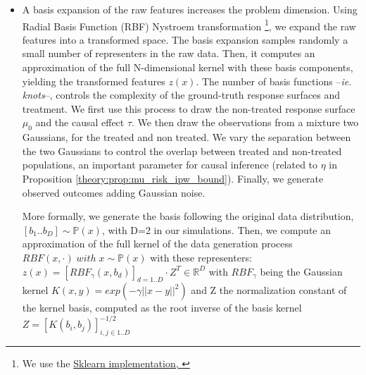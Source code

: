 \documentclass[unnumsec,webpdf,contemporary,large]{oup-authoring-template}%
\theoremstyle{thmstyleone}%
\theoremstyle{thmstyletwo}%
\theoremstyle{thmstylethree}%
\begin{document}
\begin{appendices}
\begin{itemize}
        \item A basis expansion of the raw features increases the problem dimension.
              Using Radial Basis Function (RBF) Nystroem transformation \footnote{We
                  use the
                  \href{https://scikit-learn.org/stable/modules/generated/sklearn.kernel_approximation.Nystroem.html}{Sklearn
                      implementation, \cite{pedregosa_scikitlearn_2011}}}, we expand the raw
              features into a transformed space. The basis expansion samples
              randomly a small number of representers in the raw data. Then,  it
              computes an approximation of the full N-dimensional kernel with these
              basis components, yielding the transformed features $z(x)$. The number
              of basis functions --\emph{ie. knots}--, controls the complexity of
              the ground-truth response surfaces and treatment. We first use this
              process to draw the non-treated response surface $\mu_0$ and the
              causal effect $\tau$. We then draw the observations from a mixture two
              Gaussians, for the treated and non treated. We vary the separation
              between the two Gaussians to control the overlap between treated and
              non-treated populations, an important parameter for causal inference
              (related to $\eta$ in Proposition
              \ref{theory:prop:mu_risk_ipw_bound}). Finally, we generate observed
              outcomes adding Gaussian noise.

              More formally, we generate the basis following the original data
              distribution, $\left [ b_1 .. b_D \right ] \sim \mathbb P(x)$,
              with D=2 in our simulations. Then, we compute an approximation
              of the full kernel of the data generation process $RBF(x,
                  \cdot) \;  with \; x \sim \mathbb P(x)$ with these
              representers: $z(x) = [RBF_{\gamma}(x, b_d)]_{d=1..D} \cdot
                  Z^T \in \mathbb{R}^D$ with $RBF_{\gamma}$ being the Gaussian
              kernel $K(x, y) = exp(-\gamma ||x-y||^2)$ and Z the
              normalization constant of the kernel basis, computed as the
              root inverse of the basis kernel $Z=[K(b_i, b_j)]_{i, j \in
                  {1..D}}^{-1/2}$



\end{itemize}
\end{appendices}
\end{document}
